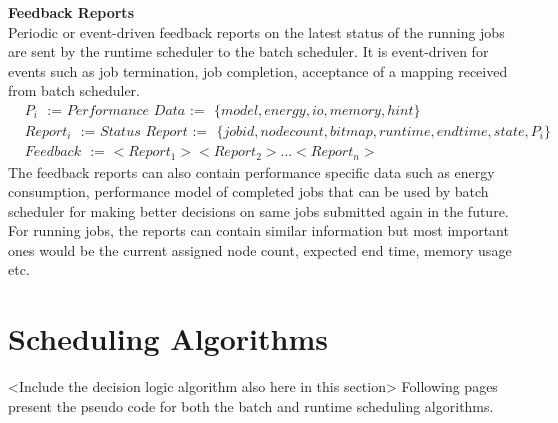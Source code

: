 \textbf{Feedback Reports}\\
Periodic or event-driven feedback reports on the latest status of the running jobs are sent by the runtime scheduler to the batch scheduler. It is event-driven for events such as job termination, job completion, acceptance of a mapping received from batch scheduler.
\begin{equation*}
\begin{aligned}
&P_{i}\ \ \ \textit{:=\ \ \ Performance Data\ \ \ :=}\ \ \ \{model,energy,io,memory,hint\}\\
&Report_{i}\ \ \ \textit{:=\ \ \ Status Report\ \ \ :=}\ \ \ \{jobid,node count,bitmap,run time,end time,state,P_{i}\}\\
&Feedback\ \ \ \textit{:=\ \ \ $<Report_{1}><Report_{2}>...<Report_{n}>$}
\end{aligned}
\end{equation*}
The feedback reports can also contain performance specific data such as energy consumption, performance model of completed jobs that can be used by batch scheduler for making better decisions on same jobs submitted again in the future. For running jobs, the reports can contain similar information but most important ones would be the current assigned node count, expected end time, memory usage etc.
\section{Scheduling Algorithms}
<Include the decision logic algorithm also here in this section>
Following pages present the pseudo code for both the batch and runtime scheduling algorithms. 
